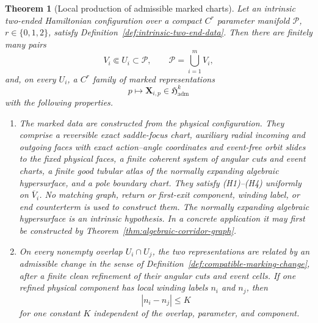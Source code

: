 \documentclass[11pt]{amsart}
\numberwithin{equation}{section}
\newtheorem{theorem}{Theorem}[section]
\theoremstyle{definition}
\theoremstyle{remark}
\begin{document}
\begin{theorem}[Local production of admissible marked charts]
\label{thm:local-chart-production}
Let an intrinsic two-ended Hamiltonian configuration over a compact
$C^r$ parameter manifold $\mathcal P$, $r\in\{0,1,2\}$, satisfy
Definition~\ref{def:intrinsic-two-end-data}.  Then there are finitely many
pairs
\begin{equation}\label{eq:finite-parameter-chart-cover}
 V_i\Subset U_i\subset\mathcal P,
 \qquad \mathcal P=\bigcup_{i=1}^m V_i,
\end{equation}
and, on every $U_i$, a $C^r$ family of marked representations
\begin{equation}\label{eq:produced-marked-family}
 p\longmapsto\mathbf X_{i,p}\in\mathfrak H_{\mathrm{adm}}^k
\end{equation}
with the following properties.
\begin{enumerate}
\renewcommand{\labelenumi}{\textup{(\alph{enumi})}}
\item The marked data are constructed from the physical configuration.
They comprise a reversible exact saddle-focus chart, auxiliary radial
incoming and outgoing faces with exact action--angle coordinates and
event-free orbit slides to the fixed physical faces, a finite
coherent system of angular cuts and event charts, a finite good tubular
atlas of the normally expanding algebraic hypersurface, and a pole boundary
chart.  They satisfy
\textup{(H1)}--\textup{(H4)} uniformly on $\overline V_i$.  No matching
graph, return or first-exit component, winding label, or end counterterm is
used to construct them.  The normally expanding algebraic hypersurface is
an intrinsic hypothesis.  In a concrete application it may first be
constructed by Theorem~\ref{thm:algebraic-corridor-graph}.

\item On every nonempty overlap $U_i\cap U_j$, the two representations are
related by an admissible change in the sense of
Definition~\ref{def:compatible-marking-change}, after a finite clean
refinement of their angular cuts and event cells.  If one refined physical
component has local winding labels $n_i$ and $n_j$, then
\begin{equation}\label{eq:chart-production-bounded-recoding}
 |n_i-n_j|\le K
\end{equation}
for one constant $K$ independent of the overlap, parameter, and component.


\end{enumerate}
\end{theorem}
\end{document}
